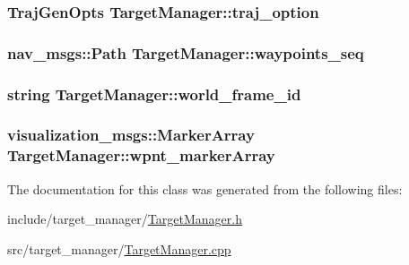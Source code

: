 \subsubsection[{\texorpdfstring{traj\+\_\+option}{traj_option}}]{\setlength{\rightskip}{0pt plus 5cm}Traj\+Gen\+Opts Target\+Manager\+::traj\+\_\+option\hspace{0.3cm}{\ttfamily [private]}}\hypertarget{class_target_manager_aedeaed09b33f06298fc63d0a87df0f37}{}\label{class_target_manager_aedeaed09b33f06298fc63d0a87df0f37}
\subsubsection[{\texorpdfstring{waypoints\+\_\+seq}{waypoints_seq}}]{\setlength{\rightskip}{0pt plus 5cm}nav\+\_\+msgs\+::\+Path Target\+Manager\+::waypoints\+\_\+seq\hspace{0.3cm}{\ttfamily [private]}}\hypertarget{class_target_manager_adde18a55a5e093c08584f625e76a0c9e}{}\label{class_target_manager_adde18a55a5e093c08584f625e76a0c9e}
\subsubsection[{\texorpdfstring{world\+\_\+frame\+\_\+id}{world_frame_id}}]{\setlength{\rightskip}{0pt plus 5cm}string Target\+Manager\+::world\+\_\+frame\+\_\+id\hspace{0.3cm}{\ttfamily [private]}}\hypertarget{class_target_manager_aaab8041311692af50c7e8e3578072df2}{}\label{class_target_manager_aaab8041311692af50c7e8e3578072df2}
\subsubsection[{\texorpdfstring{wpnt\+\_\+marker\+Array}{wpnt_markerArray}}]{\setlength{\rightskip}{0pt plus 5cm}visualization\+\_\+msgs\+::\+Marker\+Array Target\+Manager\+::wpnt\+\_\+marker\+Array\hspace{0.3cm}{\ttfamily [private]}}\hypertarget{class_target_manager_afe26632f7b5444f6922016175b5c1a94}{}\label{class_target_manager_afe26632f7b5444f6922016175b5c1a94}


The documentation for this class was generated from the following files\+:\begin{DoxyCompactItemize}
\item 
include/target\+\_\+manager/\hyperlink{_target_manager_8h}{Target\+Manager.\+h}\item 
src/target\+\_\+manager/\hyperlink{_target_manager_8cpp}{Target\+Manager.\+cpp}\end{DoxyCompactItemize}
